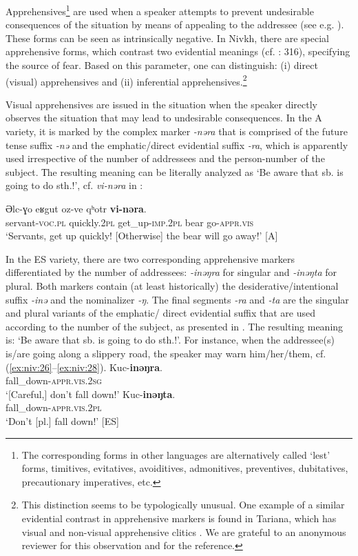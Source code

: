 \documentclass[output=paper,colorlinks,citecolor=brown]{langscibook}
\begin{document}
Apprehensives\footnote{The corresponding forms in other languages are alternatively called ‘lest’ forms, timitives, evitatives, avoiditives, admonitives, preventives, dubitatives, precautionary imperatives, etc.} are used when a speaker attempts to prevent undesirable consequences of the situation by means of appealing to the addressee (see e.g. \citealt{Lichtenberk1995}). These forms can be seen as intrinsically negative. In Nivkh, there are special apprehensive forms, which contrast two evidential meanings (cf. \citealt{Kreinovich1979}: 316), specifying the source of fear. Based on this parameter, one can distinguish: (i) direct (visual) apprehensives and (ii) inferential apprehensives.\footnote{ This distinction seems to be typologically unusual. One example of a similar evidential contrast in apprehensive markers is found in Tariana, which has visual and non-visual apprehensive clitics \citep[384--387]{Aikhenvald2003}. We are grateful to an anonymous reviewer for this observation and for the reference.}

Visual apprehensives are issued in the situation when the speaker directly observes the situation that may lead to undesirable consequences. In the A variety, it is marked by the complex marker \textit{-nəra} that is comprised of the future tense suffix \textit{-nə} and the emphatic/direct evidential suffix \textit{-ra}, which is apparently used irrespective of the number of addressees and the person-number of the subject. Тhe resulting meaning can be literally analyzed as ‘Be aware that sb. is going to do sth.!’, cf. \textit{vi-nəra} in :

\ea\label{ex:niv:25}
    \gll Əlc-ɣo eʁgut oz-ve qʰotr \textbf{vi-nəra}. \\ 
         servant-\textsc{voc.pl} quickly.\textsc{2pl} get\_up-\textsc{imp.2pl} bear go-\textsc{appr.vis} \\
    \glt ‘Servants, get up quickly! [Otherwise] the bear will go away!’ \citep[118]{Panfilov1965} [A]
\z 

In the ES variety, there are two corresponding apprehensive markers differentiated by the number of addressees: \textit{-inəŋra} for singular and \textit{-inəŋta} for plural. Both markers contain (at least historically) the desiderative/intentional suffix \textit{-inə} and the nominalizer \textit{-ŋ}. The final segments \textit{-ra} and \textit{-ta} are the singular and plural variants of the emphatic/ direct evidential suffix that are used according to the number of the subject, as presented in . The resulting meaning is: ‘Be aware that sb. is going to do sth.!’. For instance, when the addressee(s) is/are going along a slippery road, the speaker may warn him/her/them, cf. (\ref{ex:niv:26}--\ref{ex:niv:28}).
\ea\label{ex:niv:26}
    \ea\label{ex:niv:26a}
        \gll  Kuc-\textbf{inəŋra}.  \\ 
             fall\_down-\textsc{appr.vis.2sg} \\
        \glt ‘[Careful,] don’t fall down!’ 
    \ex\label{ex:niv:26b}
        \gll Kuc-\textbf{inəŋta}. \\
             fall\_down-\textsc{appr.vis.2pl} \\
        \glt ‘Don’t [pl.] fall down!’ [ES]
    \z
\z 
\end{document}
